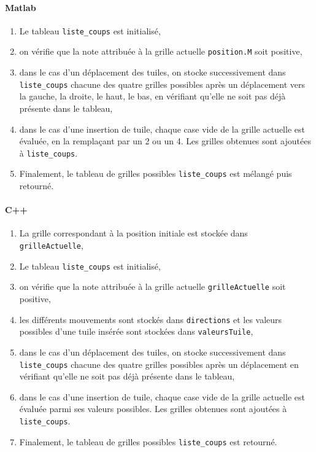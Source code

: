 \documentclass[a4paper]{report}
\begin{document}
\paragraph{Matlab}

\begin{enumerate}
\item Le tableau \verb|liste_coups| est initialisé,
\item on vérifie que la note attribuée à la grille actuelle \verb|position.M| soit positive,
\item dans le cas d'un déplacement des tuiles, on stocke successivement dans \verb|liste_coups| chacune des quatre grilles possibles après un déplacement vers la gauche, la droite, le haut, le bas, en vérifiant qu'elle ne soit pas déjà présente dans le tableau,
\item dans le cas d'une insertion de tuile, chaque case vide de la grille actuelle est évaluée, en la remplaçant par un 2 ou un 4. Les grilles obtenues sont ajoutées à \verb|liste_coups|.
\item Finalement, le tableau de grilles possibles \verb|liste_coups| est mélangé puis retourné.
\end{enumerate}

\paragraph{C++}

\begin{enumerate}
\item La grille correspondant à la position initiale est stockée dans \verb|grilleActuelle|,
\item Le tableau \verb|liste_coups| est initialisé,
\item on vérifie que la note attribuée à la grille actuelle \verb|grilleActuelle| soit positive,
\item les différents mouvements sont stockés dans \verb|directions| et les valeurs possibles d'une tuile insérée sont stockées dans \verb|valeursTuile|,
\item dans le cas d'un déplacement des tuiles, on stocke successivement dans \verb|liste_coups| chacune des quatre grilles possibles après un déplacement en vérifiant qu'elle ne soit pas déjà présente dans le tableau,
\item dans le cas d'une insertion de tuile, chaque case vide de la grille actuelle est évaluée parmi ses valeurs possibles. Les grilles obtenues sont ajoutées à \verb|liste_coups|.
\item Finalement, le tableau de grilles possibles \verb|liste_coups| est retourné.
\end{enumerate}
\end{document}
